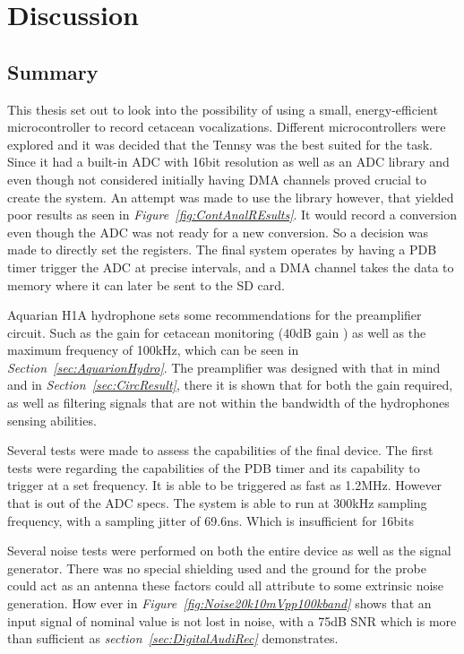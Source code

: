 \chapter{Discussion}

\section{Summary}

This thesis set out to look into the possibility of using a small, energy-efficient microcontroller to record cetacean vocalizations.
Different microcontrollers were explored and it was decided that the Tennsy was the best suited for the task.
Since it had a built-in ADC with 16bit resolution as well as an ADC library and even though not considered initially having DMA channels proved crucial to create the system.
An attempt was made to use the library however, that yielded poor results as seen in \textit{Figure~\ref{fig:ContAnalREsults}}. 
It would record a conversion even though the ADC was not ready for a new conversion.
So a decision was made to directly set the registers.
The final system operates by having a PDB timer trigger the ADC at precise intervals, and a DMA channel takes the data to memory where it can later be sent to the SD card.

Aquarian H1A hydrophone sets some recommendations for the preamplifier circuit. 
Such as the gain for cetacean monitoring (40dB gain ) as well as the maximum frequency of 100kHz, which can be seen in \textit{Section~\ref{sec:AquarionHydro}}.
The preamplifier was designed with that in mind and in \textit{Section~\ref{sec:CircResult}}, there it is shown that for both the gain required, as well as filtering signals that are not within the bandwidth of the hydrophones sensing abilities.

Several tests were made to assess the capabilities of the final device.
The first tests were regarding the capabilities of the PDB timer and its capability to trigger at a set frequency.
It is able to be triggered as fast as 1.2MHz.
However that is out of the ADC specs.
The system is able to run at 300kHz sampling frequency, with a sampling jitter of 69.6ns.
Which is insufficient for 16bits  %

Several noise tests were performed on both the entire device as well as the signal generator.
There was no special shielding used and the ground for the probe could act as an antenna these factors could all attribute to some extrinsic noise generation.
How ever in \textit{Figure~\ref{fig:Noise20k10mVpp100kband}} shows that an input signal of nominal value is not lost in noise, with a 75dB SNR which is more than sufficient as \textit{section~\ref{sec:DigitalAudiRec}} demonstrates.

